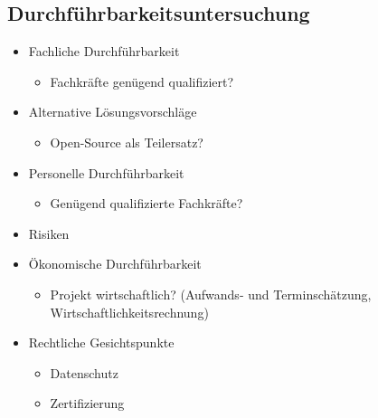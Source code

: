 		\subsection{Durchführbarkeitsuntersuchung}
					
			\begin{itemize}
				\item Fachliche Durchführbarkeit
				\begin{itemize}
					\item Fachkräfte genügend qualifiziert?
				\end{itemize}
				\item Alternative Lösungsvorschläge
				\begin{itemize}
					\item Open-Source als Teilersatz?
				\end{itemize}
				\item Personelle Durchführbarkeit
				\begin{itemize}
					\item Genügend qualifizierte Fachkräfte?
				\end{itemize}
				\item Risiken
				\item Ökonomische Durchführbarkeit
				\begin{itemize}
					\item Projekt wirtschaftlich? (Aufwands- und Terminschätzung, Wirtschaftlichkeitsrechnung)
				\end{itemize}
				\item Rechtliche Gesichtspunkte
				\begin{itemize}
					\item Datenschutz
					\item Zertifizierung
				\end{itemize}
			\end{itemize}